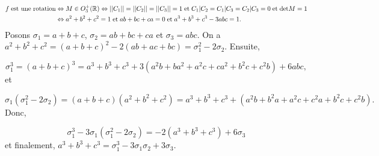 \documentclass[11pt,a4paper]{article}
\newcommand{\Rr}{\mathbb{R}} \newcommand{\R}{\mathbb{R}}
\begin{document}
\begin{align*}\ensuremath
f\;\mbox{est une rotation}&\Leftrightarrow M\in O_3^+(\Rr)\Leftrightarrow||C_1||=||C_2||=||C_3||=1\;\mbox{et}\;C_1|C_2=C_1|C_3=C_2|C_3=0\;\mbox{et}\;\mbox{det}M=1\\
 &\Leftrightarrow a^2+b^2+c^2=1\;\mbox{et}\;ab+bc+ca=0\;\mbox{et}\;a^3+b^3+c^3-3abc=1.
\end{align*}
Posons $\sigma_1=a+b+c$, $\sigma_2=ab+bc+ca$ et $\sigma_3=abc$. On a $a^2+b^2+c^2=(a+b+c)^2-2(ab+ac+bc)=\sigma_1^2-2\sigma_2$.
Ensuite,

$$\sigma_1^3=(a+b+c)^3=a^3+b^3+c^3+3(a^2b+ba^2+a^2c+ca^2+b^2c+c^2b)+6abc,$$
et 

$$\sigma_1(\sigma_1^2-2\sigma_2)=(a+b+c)(a^2+b^2+c^2)=a^3+b^3+c^3+(a^2b+b^2a+a^2c+c^2a+b^2c+c^2b).$$
Donc, 

$$\sigma_1^3-3\sigma_1(\sigma_1^2-2\sigma_2)=-2(a^3+b^3+c^3)+6\sigma_3$$ 
et finalement, $a^3+b^3+c^3=\sigma_1^3-3\sigma_1\sigma_2+3\sigma_3$. 
\end{document}
